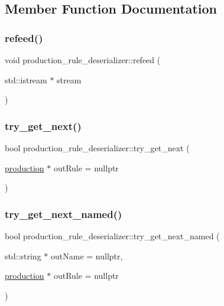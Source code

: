 \subsection{Member Function Documentation}
\mbox{\label{classproduction__rule__deserializer_a12eb54478b2e86fed70db8c7a1131111}} 
\subsubsection{\texorpdfstring{refeed()}{refeed()}}
{\footnotesize\ttfamily void production\+\_\+rule\+\_\+deserializer\+::refeed (\begin{DoxyParamCaption}\item[{std\+::istream $\ast$}]{stream }\end{DoxyParamCaption})}

\mbox{\label{classproduction__rule__deserializer_a12fef5492a82d2716670f09b558d4ce3}} 
\subsubsection{\texorpdfstring{try\_get\_next()}{try\_get\_next()}}
{\footnotesize\ttfamily bool production\+\_\+rule\+\_\+deserializer\+::try\+\_\+get\+\_\+next (\begin{DoxyParamCaption}\item[{\mbox{\hyperlink{classproduction}{production}} $\ast$}]{out\+Rule = {\ttfamily nullptr} }\end{DoxyParamCaption})}

\mbox{\label{classproduction__rule__deserializer_a0394f0fc142fa283f84a951c94bca242}} 
\subsubsection{\texorpdfstring{try\_get\_next\_named()}{try\_get\_next\_named()}}
{\footnotesize\ttfamily bool production\+\_\+rule\+\_\+deserializer\+::try\+\_\+get\+\_\+next\+\_\+named (\begin{DoxyParamCaption}\item[{std\+::string $\ast$}]{out\+Name = {\ttfamily nullptr},  }\item[{\mbox{\hyperlink{classproduction}{production}} $\ast$}]{out\+Rule = {\ttfamily nullptr} }\end{DoxyParamCaption})}



